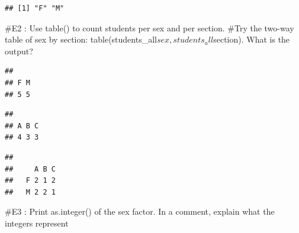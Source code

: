 \documentclass[
]{article}
\newenvironment{Shaded}{\begin{snugshade}}{\end{snugshade}}
\newcommand{\FunctionTok}[1]{\textcolor[rgb]{0.13,0.29,0.53}{\textbf{#1}}}
\newcommand{\NormalTok}[1]{#1}
\newcommand{\SpecialCharTok}[1]{\textcolor[rgb]{0.81,0.36,0.00}{\textbf{#1}}}
\begin{document}
\begin{verbatim}
## [1] "F" "M"
\end{verbatim}

\#E2 : Use table() to count students per sex and per section. \#Try the
two-way table of sex by section:
table(students\_all\(sex, students_all\)section). What is the output?

\begin{Shaded}
\end{Shaded}

\begin{verbatim}
## 
## F M 
## 5 5
\end{verbatim}

\begin{Shaded}
\end{Shaded}

\begin{verbatim}
## 
## A B C 
## 4 3 3
\end{verbatim}

\begin{Shaded}
\end{Shaded}

\begin{verbatim}
##    
##     A B C
##   F 2 1 2
##   M 2 2 1
\end{verbatim}

\#E3 : Print as.integer() of the sex factor. In a comment, explain what
the integers represent

\begin{Shaded}
\end{Shaded}
\end{document}
